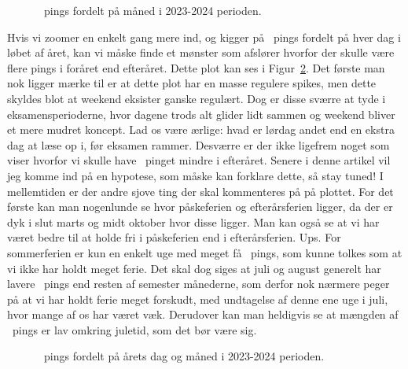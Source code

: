 \begin{article}
\begin{figure}[H]
	\centering
	\resizebox{\columnwidth}{!}{}
	\vspace{-25pt}
	\caption{\protect\coffee\ pings fordelt på måned i 2023-2024 perioden.}
	\label{fig:month_analysis_2023-2024}
\end{figure}

Hvis vi zoomer en enkelt gang mere ind, og kigger på \coffee\ pings fordelt på hver dag i løbet af året, kan vi måske finde et mønster som afslører hvorfor der skulle være flere pings i foråret end efteråret. Dette plot kan ses i Figur~\ref{fig:year_analysis_2023-2024}. Det første man nok ligger mærke til er at dette plot har en masse regulere spikes, men dette skyldes blot at weekend eksister ganske regulært.
Dog er disse sværre at tyde i eksamensperioderne, hvor dagene trods alt glider lidt sammen og weekend bliver et mere mudret koncept. Lad os være ærlige: hvad er lørdag andet end en ekstra dag at læse op i, før eksamen rammer.
Desværre er der ikke ligefrem noget som viser hvorfor vi skulle have \coffee\ pinget mindre i efteråret. Senere i denne artikel vil jeg komme ind på en hypotese, som måske kan forklare dette, så stay tuned! I mellemtiden er der andre sjove ting der skal kommenteres på på plottet.
For det første kan man nogenlunde se hvor påskeferien og efterårsferien ligger, da der er dyk i slut marts og midt oktober hvor disse ligger. Man kan også se at vi har været bedre til at holde fri i påskeferien end i efterårsferien. Ups.
For sommerferien er kun en enkelt uge med meget få \coffee\ pings, som kunne tolkes som at vi ikke har holdt meget ferie. Det skal dog siges at juli og august generelt har lavere \coffee\ pings end resten af semester månederne, som derfor nok nærmere peger på at vi har holdt ferie meget forskudt, med undtagelse af denne ene uge i juli, hvor mange af os har været væk.
Derudover kan man heldigvis se at mængden af \coffee\ pings er lav omkring juletid, som det bør være sig.

\begin{figure}[t!]
	\centering
	\resizebox{2\columnwidth}{!}{}
	\vspace{-20pt}
	\caption{\protect\coffee\ pings fordelt på årets dag og måned i 2023-2024 perioden.}
	\label{fig:year_analysis_2023-2024}
\end{figure}


\end{article}
